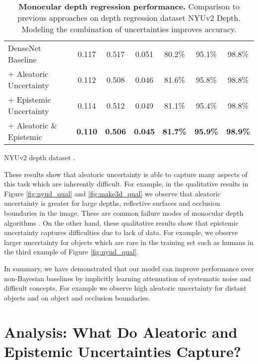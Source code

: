 \documentclass{article}
\begin{document}
\begin{table}[t]
\begin{subtable}[b]{.5\textwidth}
{\begin{tabular}{l|c|c|c|c|c|c}
    \midrule
DenseNet Baseline & 0.117 & 0.517 & 0.051 & 80.2\% & 95.1\% & 98.8\% \\
+ Aleatoric Uncertainty & 0.112 & 0.508 & 0.046 & 81.6\% & 95.8\% & 98.8\% \\
+ Epistemic Uncertainty & 0.114 & 0.512 & 0.049 & 81.1\% & 95.4\% & 98.8\% \\
+ Aleatoric \& Epistemic & \textbf{0.110} & \textbf{0.506} & \textbf{0.045} & \textbf{81.7\%} & \textbf{95.9\%} & \textbf{98.9\%} \\
    \bottomrule
\end{tabular}
}
\caption{NYUv2 depth dataset \cite{silberman2012indoor}.}
\label{nyuv2depth}
\end{subtable}
\caption{\textbf{Monocular depth regression performance.} Comparison to previous approaches on depth regression dataset NYUv2 Depth. Modeling the combination of uncertainties improves accuracy.}
\vspace{-5mm}
\end{table}



These results show that aleatoric uncertainty is able to capture many aspects of this task which are inherently difficult. For example, in the qualitative results in Figure \ref{fig:nyud_qual} and \ref{fig:make3d_qual} we observe that aleatoric uncertainty is greater for large depths, reflective surfaces and occlusion boundaries in the image. These are common failure modes of monocular depth algorithms \cite{laina2016deeper}. On the other hand, these qualitative results show that epistemic uncertainty captures difficulties due to lack of data. For example, we observe larger uncertainty for objects which are rare in the training set such as humans in the third example of Figure \ref{fig:nyud_qual}.




In summary, we have demonstrated that our model can improve performance over non-Bayesian baselines by implicitly learning attenuation of systematic noise and difficult concepts. For example we observe high aleatoric uncertainty for distant objects and on object and occlusion boundaries.





\section{Analysis: What Do Aleatoric and Epistemic Uncertainties Capture?}
\end{document}

